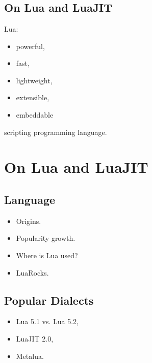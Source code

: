 \documentclass[aspectratio=169,handout,bigger]{beamer}
\begin{document}

\section*{}
\subsection*{On Lua and LuaJIT}

\begin{frame}{}
  Lua:
  \begin{itemize}
    \item powerful,
    \item fast,
    \item lightweight,
    \item extensible,
    \item embeddable
  \end{itemize}
  scripting programming language.
\end{frame}


\section{On Lua and LuaJIT}
\subsection*{Language}

\begin{frame}
  \begin{itemize}
    \item Origins.
    \item Popularity growth.
    \item Where is Lua used?
    \item LuaRocks.
  \end{itemize}
\end{frame}


\subsection*{Popular Dialects}

\begin{frame}
  \begin{itemize}
    \item Lua 5.1 vs. Lua 5.2,
    \item LuaJIT 2.0,
    \item Metalua.
  \end{itemize}
\end{frame}
\end{document}
